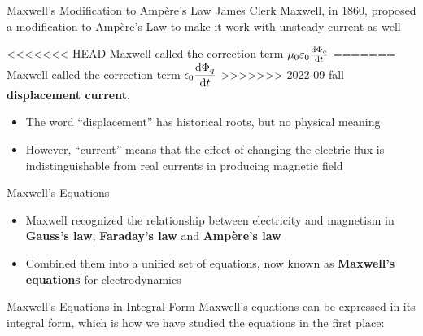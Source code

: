 \documentclass[12pt,aspectratio=169]{beamer}
\begin{document}
\begin{frame}{Maxwell's Modification to Amp\`{e}re's Law}
  James Clerk Maxwell, in 1860, proposed a modification to Amp\`{e}re's Law
  to make it work with unsteady current as well


<<<<<<< HEAD
  Maxwell called the correction term $\mu_0\varepsilon_0\diff{\Phi_q}t$
=======
  Maxwell called the correction term $\displaystyle\epsilon_0\diff{\Phi_q}t$
>>>>>>> 2022-09-fall
  \textbf{displacement current}.
  \begin{itemize}
  \item The word ``displacement'' has historical roots, but no physical meaning
  \item However, ``current'' means that the effect of changing the electric
    flux is indistinguishable from real currents in producing magnetic field
  \end{itemize}
\end{frame}



\begin{frame}{Maxwell's Equations}
  \begin{itemize}
  \item Maxwell recognized the relationship between electricity and
    magnetism in \textbf{Gauss's law}, \textbf{Faraday's law} and
    \textbf{Amp\`{e}re's law}
  \item Combined them into a unified set of equations, now known as
    \textbf{Maxwell's equations} for electrodynamics
  \end{itemize}
\end{frame}



\begin{frame}{Maxwell's Equations in Integral Form}
  Maxwell's equations can be expressed in its integral form, which is how we
  have studied the equations in the first place:

\end{frame}
\end{document}
